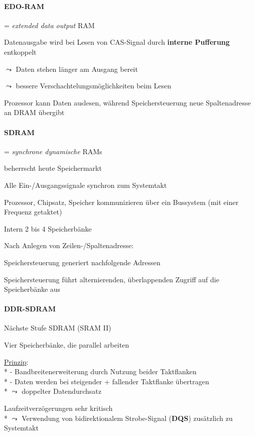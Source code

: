 \paragraph{EDO-RAM}
\begin{items}
	\item = \emph{extended data output} RAM
	\item Datenausgabe wird bei Lesen von CAS-Signal durch \textbf{interne Pufferung} entkoppelt
	\item \( \leadsto \) Daten stehen länger am Ausgang bereit
	\item \( \leadsto \) bessere Verschachtelungsmöglichkeiten beim Lesen
	\item Prozessor kann Daten auslesen, während Speichersteuerung neue Spaltenadresse an DRAM übergibt
\end{items}

\paragraph{SDRAM}
\begin{items}
	\item = \emph{synchrone dynamische} RAMs
	\item beherrscht heute Speichermarkt
	\item Alle Ein-/Ausgangssignale synchron zum Systemtakt
	\item Prozessor, Chipsatz, Speicher kommunizieren über ein Bussystem (mit einer Frequenz getaktet)
	\item Intern 2 bis 4 Speicherbänke
	\item Nach Anlegen von Zeilen-/Spaltenadresse:
	\begin{enumeration}
		\item Speichersteuerung generiert nachfolgende Adressen
		\item Speichersteuerung führt alternierenden, überlappenden Zugriff auf die Speicherbänke aus
	\end{enumeration}
\end{items}

\paragraph{DDR-SDRAM}
\begin{items}
	\item Nächste Stufe SDRAM (SRAM II)
	\item Vier Speicherbänke, die parallel arbeiten
	\item \underline{Prinzip}: \\*
	 	- Bandbreitenerweiterung durch Nutzung beider Taktflanken \\*
	 	- Daten werden bei steigender + fallender Taktflanke übertragen \\*
	 	\( \leadsto \) doppelter Datendurchsatz
	\item Laufzeitverzögerungen sehr kritisch \\*
		\( \leadsto \) Verwendung von bidirektionalem Strobe-Signal (\textbf{DQS}) zusätzlich zu Systemtakt
\end{items}

